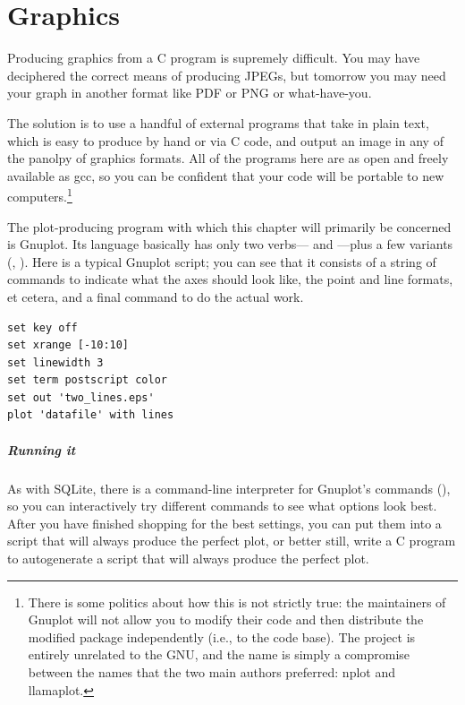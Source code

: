 \chapter{Graphics} \label{gnuplot} 

Producing graphics from a C program is supremely difficult. You may have
deciphered the correct means of producing JPEGs, but tomorrow you may
need your graph in another format like PDF or PNG or what-have-you.

The solution is to use a handful of external
programs that take in plain text, which is easy to produce by hand or
via C code, and output an image in any of the panolpy of graphics
formats.  All of the programs here are as open and freely available as
gcc, so you can be confident that your code will be portable to new
computers.\footnote{There is some politics about how this is not strictly
true: the maintainers of Gnuplot will not allow you to modify their
code and then distribute the modified package independently (i.e., to
 the code base). The project is entirely unrelated to the GNU,
and the name is simply a compromise between the names that the two main
authors preferred: nplot and llamaplot.}

The plot-producing program with which this chapter will primarily be
concerned is Gnuplot. Its language
basically has only two verbs--- and ---plus a few
variants (, ). Here is a typical Gnuplot script;
you can see that it
consists of a string of  commands to indicate what the axes
should look like, the point and line formats, et cetera, and a final
 command to do the actual work.
\begin{lstlisting}
set key off
set xrange [-10:10]
set linewidth 3
set term postscript color
set out 'two_lines.eps'
plot 'datafile' with lines
\end{lstlisting}

\paragraph{Running it}
As with SQLite, there is a command-line interpreter for Gnuplot's
commands (), so you can
interactively try different  commands to see what options look
best. After you have finished shopping for the best settings, you can
put them into a script that will always produce the perfect plot, or
better still, write a C program to autogenerate a script that will
always produce the perfect plot.

